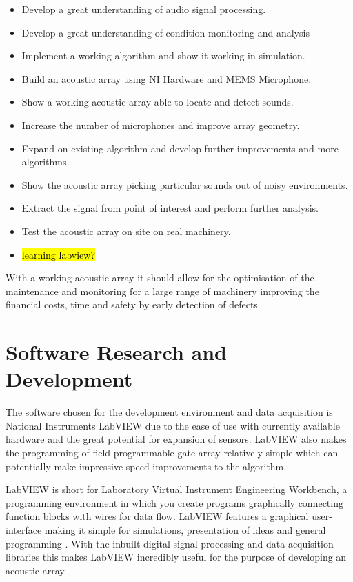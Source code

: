 \documentclass{UoNMCHA}
\numberwithin{equation}{section}
\begin{document}
    \begin{itemize}
        \item Develop a great understanding of audio signal processing.
        \item Develop a great understanding of condition monitoring and analysis
        \item Implement a working algorithm and show it working in simulation.
        \item Build an acoustic array using NI Hardware and MEMS Microphone.
        \item Show a working acoustic array able to locate and detect sounds.
        \item Increase the number of microphones and improve array geometry. 
        \item Expand on existing algorithm and develop further improvements and more algorithms.
        \item Show the acoustic array picking particular sounds out of noisy environments.
        \item Extract the signal from point of interest and perform further analysis.
        \item Test the acoustic array on site on real machinery.
        \item \hl{learning labview?}
    \end{itemize}
    
    With a working acoustic array it should allow for the optimisation of the maintenance and monitoring for a large range of machinery improving the financial costs, time and safety by early detection of defects.
\newpage
\section{Software Research and Development} \label{sec:Software}
    The software chosen for the development environment and data acquisition is National Instruments LabVIEW due to the ease of use with currently available hardware and the great potential for expansion of sensors. LabVIEW also makes the programming of field programmable gate array relatively simple which can potentially make impressive speed improvements to the algorithm.
    
    LabVIEW is short for Laboratory Virtual Instrument Engineering Workbench, a programming environment in which you create programs graphically connecting function blocks with wires for data flow. LabVIEW features a graphical user-interface making it simple for simulations, presentation of ideas and general programming \citep{Tra06}. With the inbuilt digital signal processing and data acquisition libraries this makes LabVIEW incredibly useful for the purpose of developing an acoustic array.
\end{document}
